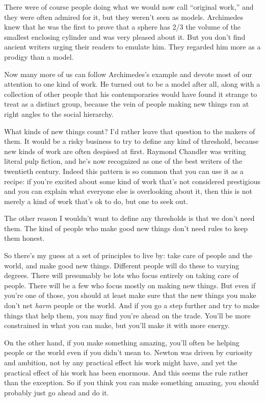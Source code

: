 There were of course people doing what we would now call ``original
work,'' and they were often admired for it, but they weren't seen as
models. Archimedes knew that he was the first to prove that a sphere has
2/3 the volume of the smallest enclosing cylinder and was very pleased
about it. But you don't find ancient writers urging their readers to
emulate him. They regarded him more as a prodigy than a model.

Now many more of us can follow Archimedes's example and devote most of
our attention to one kind of work. He turned out to be a model after
all, along with a collection of other people that his contemporaries
would have found it strange to treat as a distinct group, because the
vein of people making new things ran at right angles to the social
hierarchy.

What kinds of new things count? I'd rather leave that question to the
makers of them. It would be a risky business to try to define any kind
of threshold, because new kinds of work are often despised at first.
Raymond Chandler was writing literal pulp fiction, and he's now
recognized as one of the best writers of the twentieth century. Indeed
this pattern is so common that you can use it as a recipe: if you're
excited about some kind of work that's not considered prestigious and
you can explain what everyone else is overlooking about it, then this is
not merely a kind of work that's ok to do, but one to seek out.

The other reason I wouldn't want to define any thresholds is that we
don't need them. The kind of people who make good new things don't need
rules to keep them honest.

So there's my guess at a set of principles to live by: take care of
people and the world, and make good new things. Different people will do
these to varying degrees. There will presumably be lots who focus
entirely on taking care of people. There will be a few who focus mostly
on making new things. But even if you're one of those, you should at
least make sure that the new things you make don't net \emph{harm}
people or the world. And if you go a step further and try to make things
that help them, you may find you're ahead on the trade. You'll be more
constrained in what you can make, but you'll make it with more energy.

On the other hand, if you make something amazing, you'll often be
helping people or the world even if you didn't mean to. Newton was
driven by curiosity and ambition, not by any practical effect his work
might have, and yet the practical effect of his work has been enormous.
And this seems the rule rather than the exception. So if you think you
can make something amazing, you should probably just go ahead and do it.

